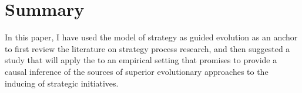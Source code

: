 \documentclass[12pt,letterpaper]{article}
\begin{document}
\section{Summary}
In this paper, I have used the \cite{Lovas2000} model of strategy as guided evolution as an anchor to first review the literature on strategy process research, and then suggested a study that will apply the \cite{Lovas2000} to an empirical setting that promises to provide a causal inference of the sources of superior evolutionary approaches to the inducing of strategic initiatives. 



\begin{singlespace}
\renewcommand{\refname}{REFERENCES}
 

\end{singlespace}
\end{document}
